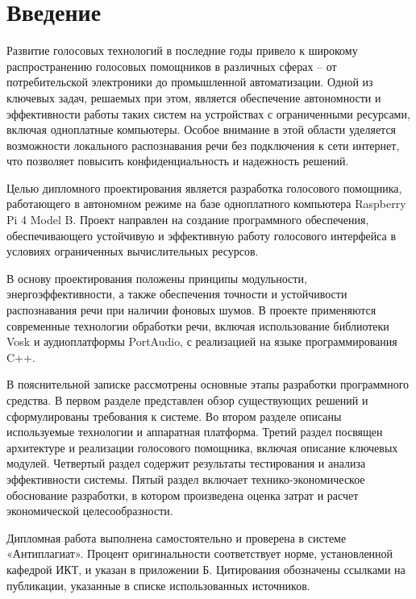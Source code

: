 
\section*{Введение}

Развитие голосовых технологий в последние годы привело к широкому распространению голосовых помощников в различных сферах -- от потребительской электроники до промышленной автоматизации. Одной из ключевых задач, решаемых при этом, является обеспечение автономности и эффективности работы таких систем на устройствах с ограниченными ресурсами, включая одноплатные компьютеры. Особое внимание в этой области уделяется возможности локального распознавания речи без подключения к сети интернет, что позволяет повысить конфиденциальность и надежность решений.

Целью дипломного проектирования является разработка голосового помощника, работающего в автономном режиме на базе одноплатного компьютера Raspberry Pi 4 Model B. Проект направлен на создание программного обеспечения, обеспечивающего устойчивую и эффективную работу голосового интерфейса в условиях ограниченных вычислительных ресурсов.

В основу проектирования положены принципы модульности, энергоэффективности, а также обеспечения точности и устойчивости распознавания речи при наличии фоновых шумов. В проекте применяются современные технологии обработки речи, включая использование библиотеки Vosk и аудиоплатформы PortAudio, с реализацией на языке программирования C++.

В пояснительной записке рассмотрены основные этапы разработки программного средства. В первом разделе представлен обзор существующих решений и сформулированы требования к системе. Во втором разделе описаны используемые технологии и аппаратная платформа. Третий раздел посвящен архитектуре и реализации голосового помощника, включая описание ключевых модулей. Четвертый раздел содержит результаты тестирования и анализа эффективности системы. Пятый раздел включает технико-экономическое обоснование разработки, в котором произведена оценка затрат и расчет экономической целесообразности.

Дипломная работа выполнена самостоятельно и проверена в системе «Антиплагиат». Процент оригинальности соответствует норме, установленной кафедрой ИКТ, и указан в приложении Б. Цитирования обозначены ссылками на публикации, указанные в списке использованных источников.

\newpage

